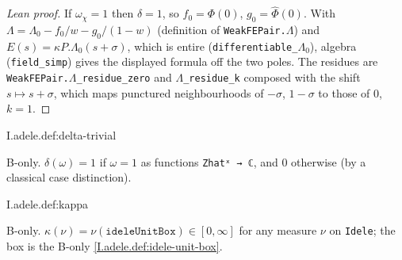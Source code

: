 \begin{proof}[Lean proof]
If $\omega_\chi=1$ then $\delta=1$, so $f_0=\Phi(0)$, $g_0=\hat\Phi(0)$. With $\Lambda=\Lambda_0-f_0/w-g_0/(1-w)$ (definition of \texttt{WeakFEPair.}$\Lambda$) and $E(s)=\kappa P.\Lambda_0(s+\sigma)$, which is entire (\texttt{differentiable\_}$\Lambda_0$), algebra (\texttt{field\_simp}) gives the displayed formula off the two poles. The residues are \texttt{WeakFEPair.}$\Lambda$\texttt{\_residue\_zero} and \texttt{}$\Lambda$\texttt{\_residue\_k} composed with the shift $s\mapsto s+\sigma$, which maps punctured neighbourhoods of $-\sigma$, $1-\sigma$ to those of $0$, $k=1$.
\end{proof}

\begin{definition}
\bonly
{}
\end{definition}
\begin{tfformal}{I.adele.def:delta-trivial}
\begin{tffidelity}
B-only. $\delta(\omega)=1$ if $\omega=1$ as functions \texttt{Zhatˣ → ℂ}, and $0$ otherwise (by a classical case distinction).
\end{tffidelity}
\end{tfformal}

\begin{definition}
\bonly
{}
\end{definition}
\begin{tfformal}{I.adele.def:kappa}
\begin{tffidelity}
B-only. $\kappa(\nu)=\nu(\texttt{ideleUnitBox})\in[0,\infty]$ for any measure $\nu$ on \texttt{Idele}; the box is the B-only \cref{I.adele.def:idele-unit-box}.
\end{tffidelity}
\end{tfformal}

